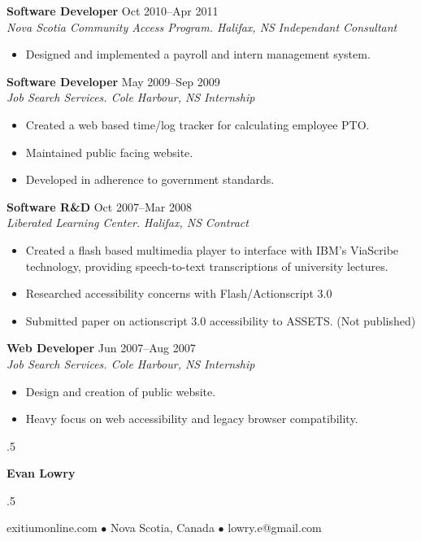 \documentclass[line,margin]{res}
\begin{document}
\begin{resume}
\textbf{Software Developer} \hfill Oct 2010--Apr 2011 \\
\textit{Nova Scotia Community Access Program. Halifax, NS} \hfill \textit{Independant Consultant}
\begin{itemize}  \itemsep-2pt
    \item Designed and implemented a payroll and intern management system.
\end{itemize} 

\textbf{Software Developer} \hfill May 2009--Sep 2009 \\
\textit{Job Search Services. Cole Harbour, NS} \hfill \textit{Internship}
\begin{itemize} \itemsep-2pt
    \item Created a web based time/log tracker for calculating employee PTO.
    \item Maintained public facing website.
    \item Developed in adherence to government standards.
\end{itemize}

\textbf{Software R\&D} \hfill Oct 2007--Mar 2008 \\
\textit{Liberated Learning Center. Halifax, NS} \hfill \textit{Contract}
\begin{itemize} \itemsep-2pt
    \item Created a flash based multimedia player to interface with IBM's ViaScribe technology, providing speech-to-text transcriptions of university lectures.
    \item Researched accessibility concerns with Flash/Actionscript 3.0
    \item Submitted paper on actionscript 3.0 accessibility to ASSETS. (Not published)
\end{itemize}

\textbf{Web Developer} \hfill Jun 2007--Aug 2007 \\
\textit{Job Search Services. Cole Harbour, NS} \hfill \textit{Internship}
\begin{itemize} \itemsep-2pt
    \item Design and creation of public website.
    \item Heavy focus on web accessibility and legacy browser compatibility.
\end{itemize}
\end{resume}
\clearpage

\moveleft.5\hoffset\centerline{\LARGE\bf Evan Lowry}
\moveleft.5\hoffset\centerline{exitiumonline.com   {$\bullet$}   Nova Scotia, Canada {$\bullet$}   lowry.e@gmail.com}
\end{document}
